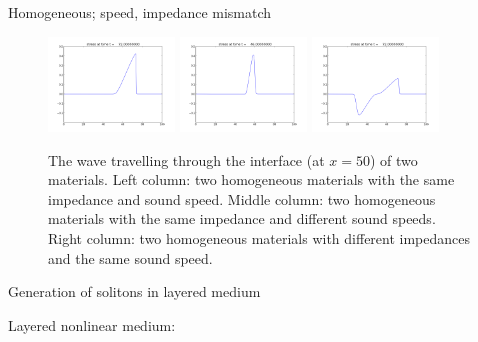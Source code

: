 \documentclass{beamer}
\begin{document}
\begin{frame}{Homogeneous; speed, impedance mismatch}
\begin{figure}
    \includegraphics[width=0.3\textwidth]{homo4.png}
  \includegraphics[width=0.3\textwidth]{sound4.png}
  \includegraphics[width=0.3\textwidth]{reflect4.png}
  \caption{The wave travelling through the interface (at $x=50$) of two materials. Left column: two homogeneous materials with the same impedance and sound speed. Middle column: two homogeneous materials with the same impedance and different sound speeds. Right column: two homogeneous materials with different impedances and the same sound speed.}
  \label{imp}
\end{figure}
\end{frame}

\begin{frame}{Generation of solitons in layered medium}
\begin{center}
Layered nonlinear medium:\\

\end{center}
\end{frame}
\end{document}
